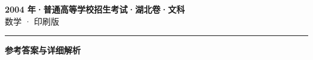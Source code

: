 \documentclass[zihao=5, a4paper]{ctexart}
\begin{document}
\begin{center}
  {\Large\bfseries 2004 年·普通高等学校招生考试·湖北卷·文科}\\[4pt]
  {\large 数学 · 印刷版}
\end{center}
\medskip
{}

\par\bigskip\hrule\bigskip
{}
\begin{center}{\large\bfseries 参考答案与详细解析}\end{center}
\smallskip

\end{document}
